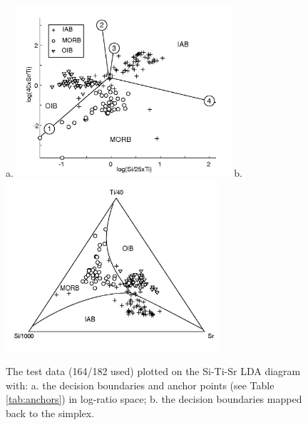 \begin{figure}[htbp]
  \centering
a.  \includegraphics[width=300]{figures/log_Si_Ti_Sr_lin.jpg}
b.  \includegraphics[width=300]{figures/test_Si_Ti_Sr_lin.jpg}
  \caption[The test data plotted on the Si-Ti-Sr diagram]
{The  test data  (164/182 used)  plotted on  the Si-Ti-Sr  LDA diagram
with:  a.   the  decision  boundaries  and anchor  points  (see  Table
\ref{tab:anchors})  in log-ratio  space; b.   the  decision boundaries
mapped back to the simplex.}
  \label{fig:log_Si_Ti_Sr}
\end{figure}

